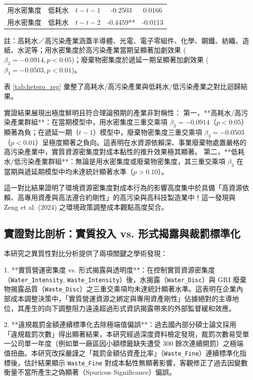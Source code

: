 \documentclass[12pt,a4paper]{article}
\begin{document}
\begin{table}[H]
\begin{threeparttable}
\begin{tabular}{llccc}
用水密集度 & 低耗水 & $t-t-1$ & -0.2503 & 0.0166 \\
用水密集度 & 低耗水 & $t-t-2$ & -0.4459** & -0.0113 \\
\bottomrule
\end{tabular}
\begin{tablenotes}
\small
\item 註：高耗水／高污染產業涵蓋半導體、光電、電子零組件、化學、鋼鐵、紡織、造紙、水泥等；用水密集度於高污染產業當期呈顯著加劇效果 ($\beta_3 = -0.0914, p < 0.05$)；廢棄物密集度於遞延一期呈顯著加劇效果 ($\beta_3 = -0.0503, p < 0.01$)。
\end{tablenotes}
\end{threeparttable}
\end{table}

表 \ref{tab:hetero_reg} 彙整了高耗水/高污染產業與低耗水/低污染產業之對比迴歸結果。

實證結果展現出極度鮮明且符合理論預期的產業非對稱性：
第一，**高耗水/高污染產業群組**：在當期模型中，用水密集度三重交乘項 $\beta_3 = -0.0914$（$p < 0.05$）顯著為負；在遞延一期（$t-1$）模型中，廢棄物密集度三重交乘項 $\beta_3 = -0.0503$（$p < 0.01$）呈極度顯著之負向。這表明在水資源依賴深、事業廢棄物處置嚴格的高污染產業中，實質資源密集度對成本黏性的推升效果極其顯著。
第二，**低耗水/低污染產業群組**：無論是用水密集度或廢棄物密集度，其三重交乘項 $\beta_3$ 在當期與遞延期模型中均未達統計顯著水準（$p > 0.10$）。

這一對比結果證明了環境資源密集度對成本行為的影響高度集中於具備「高資源依賴、高專用資產與高法遵合約剛性」的高污染與高科技製造業中！這一發現與 Zeng et al. (2024) 之環境政策調整成本觀點高度契合。

\subsection{實證對比剖析：實質投入 vs. 形式揭露與裁罰標準化}

本研究之異質性對比分析提供了兩項關鍵之學術發現：

1. **實質營運密集度 vs. 形式揭露與透明度**：在控制實質資源密集度（\texttt{Water\_Intensity}, \texttt{Waste\_Intensity}）後，水揭露（\texttt{Water\_Disc}）與 GRI 廢棄物揭露品質（\texttt{Waste\_Disc}）之三重交乘項均未達統計顯著水準。這表明在企業內部成本調整決策中，「實質營運資源之綁定與專用資產剛性」佔據絕對的主導地位，其產生的向下調整阻力遠遠超過形式資訊揭露帶來的外部監督緩和效應。

2. **違規裁罰金額連續標準化去除極端值偏誤**：過去國內部分碩士論文採用「違規裁罰次數」得出顯著結果，本研究經過深度資料檢定發現，裁罰次數易受單一公司單一年度（例如單一廠區因小額標籤缺失遭受 300 餘次連續開罰）之極端值扭曲。本研究改採嚴謹之「裁罰金額佔資產比率」（\texttt{Waste\_Fine}）連續標準化指標後，估計結果顯示 \texttt{Waste\_Fine} 對成本黏性無顯著影響，客觀修正了過去因變數衡量不當所產生之偽顯著（Spurious Significance）偏誤。
\end{document}
